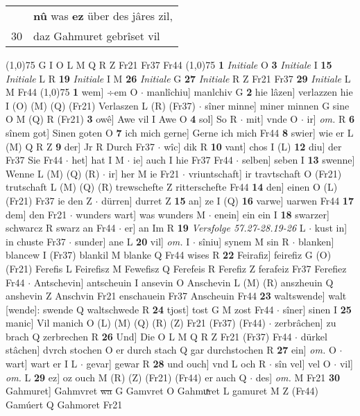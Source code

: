 \documentclass[8pt,a4paper,notitlepage]{article}
\begin{document}
\begin{table}[ht]
\begin{minipage}[t]{0.5\linewidth}
\begin{tabular}{rl}
 & \textbf{nû} was \textbf{ez} über des jâres zil,\\ 
30 & daz Gahmuret gebrîset vil\\ 
\end{tabular}
\scriptsize
\line(1,0){75} \newline
G I O L M Q R Z Fr21 Fr37 Fr44 \newline
\line(1,0){75} \newline
\textbf{1} \textit{Initiale} O  \textbf{3} \textit{Initiale} I  \textbf{15} \textit{Initiale} L R  \textbf{19} \textit{Initiale} I M  \textbf{26} \textit{Initiale} G  \textbf{27} \textit{Initiale} R Z Fr21 Fr37  \textbf{29} \textit{Initiale} L M Fr44  \newline
\line(1,0){75} \newline
\textbf{1} wem] ÷em O  $\cdot$ manlîchiu] manlchiv G \textbf{2} hie lâzen] verlazzen hie I (O) (M) (Q) (Fr21) Verlaszen L (R) (Fr37)  $\cdot$ sîner minne] miner minnen G sine O M (Q) R (Fr21) \textbf{3} owê] Awe vil I Awe O \textbf{4} sol] So R  $\cdot$ mit] vnde O  $\cdot$ ir] \textit{om.} R \textbf{6} sînem got] Sinen goten O \textbf{7} ich mich gerne] Gerne ich mich Fr44 \textbf{8} swier] wie er L (M) Q R Z \textbf{9} der] Jr R Durch Fr37  $\cdot$ wîc] dik R \textbf{10} vant] chos I (L) \textbf{12} diu] der Fr37 Sie Fr44  $\cdot$ het] hat I M  $\cdot$ ie] auch I hie Fr37 Fr44  $\cdot$ selben] seben I \textbf{13} swenne] Wenne L (M) (Q) (R)  $\cdot$ ir] her M ie Fr21  $\cdot$ vriuntschaft] ir travtschaft O (Fr21) trutschaft L (M) (Q) (R) trewschefte Z ritterschefte Fr44 \textbf{14} den] einen O (L) (Fr21) Fr37 ie den Z  $\cdot$ dürren] durret Z \textbf{15} an] ze I (Q) \textbf{16} varwe] uarwen Fr44 \textbf{17} dem] den Fr21  $\cdot$ wunders wart] was wunders M  $\cdot$ enein] ein ein I \textbf{18} swarzer] schwarcz R swarz an Fr44  $\cdot$ er] an Im R \textbf{19} \textit{Versfolge 57.27-28.19-26} L   $\cdot$ kust in] in chuste Fr37  $\cdot$ sunder] ane L \textbf{20} vil] \textit{om.} I  $\cdot$ sîniu] synem M sin R  $\cdot$ blanken] blancew I (Fr37) blankil M blanke Q Fr44 wises R \textbf{22} Feirafiz] feirefiz G (O) (Fr21) Ferefis L Feirefisz M Fewefisz Q Ferefeis R Ferefiz Z ferafeiz Fr37 Ferefiez Fr44  $\cdot$ Antschevin] antscheuin I ansevin O Anschevin L (M) (R) anszheuin Q anshevin Z Anschvin Fr21 enschauein Fr37 Anscheuin Fr44 \textbf{23} waltswende] walt [wende]: swende Q waltschwede R \textbf{24} tjost] tost G M zost Fr44  $\cdot$ sîner] sinen I \textbf{25} manic] Vil manich O (L) (M) (Q) (R) (Z) Fr21 (Fr37) (Fr44)  $\cdot$ zerbrâchen] zu brach Q zerbrechen R \textbf{26} Und] Die O L M Q R Z Fr21 (Fr37) Fr44  $\cdot$ dürkel stâchen] dvrch stochen O er durch stach Q gar durchstochen R \textbf{27} ein] \textit{om.} O  $\cdot$ wart] wart er I L  $\cdot$ gevar] gewar R \textbf{28} und ouch] vnd L och R  $\cdot$ sîn vel] vel O  $\cdot$ vil] \textit{om.} L \textbf{29} ez] oz ouch M (R) (Z) (Fr21) (Fr44) er auch Q  $\cdot$ des] \textit{om.} M Fr21 \textbf{30} Gahmuret] Gahmvret \sout{wa} G Gamvret O Gahmuͯret L gamuret M Z (Fr44) Gamúert Q Gahmoret Fr21 \newline

\end{minipage}
\end{table}
\end{document}
